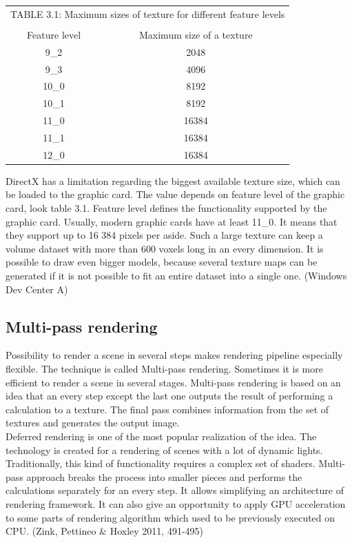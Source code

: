 \documentclass[twoside, english, 11pt]{report}
\begin{document}
\begin{table}[!h]
 \begin{center}
    \begin{tabular}{ c  c }
    \multicolumn{2}{l}{TABLE 3.1: Maximum sizes of texture for different feature levels \label{tab:level}}\\\\
    Feature level & Maximum size of a texture\\
    \hline
    9\_2 & 2048\\
    9\_3 & 4096\\
    10\_0 & 8192\\
    10\_1 & 8192\\
    11\_0 & 16384\\
    11\_1 & 16384\\
    12\_0 & 16384\\
    \end{tabular}

  \end{center}
\end{table}
DirectX has a limitation regarding the biggest available texture size, which can be loaded to the graphic card. The value depends on feature level of the graphic card, look table 3.1. Feature level defines the functionality supported by the graphic card. Usually, modern graphic cards have at least 11\_0. It means that they support up to 16 384 pixels per aside. Such a large texture can keep a volume dataset with more than 600 voxels long in an every dimension. It is possible to draw even bigger models, because several texture maps can be generated if it is not possible to fit an entire dataset into a single one. (Windows Dev Center A)\\

\subsection{Multi-pass rendering}

Possibility to render a scene in several steps makes rendering pipeline especially flexible. The technique is called Multi-pass rendering. Sometimes it is more efficient to render a scene in several stages. Multi-pass rendering is based on an idea that an every step except the last one outputs the result of performing a calculation to a texture. The final pass combines information from the set of textures and generates the output image.\\

Deferred rendering is one of the most popular realization of the idea. The technology is created for a rendering of scenes with a lot of dynamic lights. Traditionally, this kind of functionality requires a complex set of shaders. Multi-pass approach breaks the process into smaller pieces and performs the calculations separately for an every step. It allows simplifying an architecture of rendering framework. It can also give an opportunity to apply GPU acceleration to some parts of rendering algorithm which used to be previously executed on CPU. (Zink, Pettineo \& Hoxley 2011, 491-495)\\
 
\end{document}
